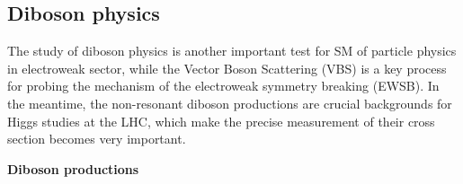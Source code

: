 \subsection{Diboson physics}
\label{diboson}

The study of diboson physics is another important test for SM of particle physics in electroweak sector, 
while the Vector Boson Scattering (VBS) is a key process for probing the mechanism of the electroweak symmetry breaking (EWSB).
In the meantime, the non-resonant diboson productions are crucial backgrounds for Higgs studies at the LHC, which make the precise measurement of their cross section becomes very important.

\textbf{Diboson productions}

